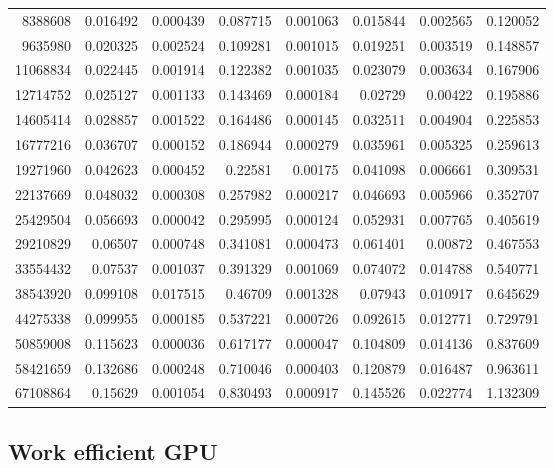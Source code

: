 \begin{longtable}{r r r r r r r r}
8388608 & 0.016492 & 0.000439 & 0.087715 & 0.001063 & 0.015844 & 0.002565 & 0.120052 \\
9635980 & 0.020325 & 0.002524 & 0.109281 & 0.001015 & 0.019251 & 0.003519 & 0.148857 \\
11068834 & 0.022445 & 0.001914 & 0.122382 & 0.001035 & 0.023079 & 0.003634 & 0.167906 \\
12714752 & 0.025127 & 0.001133 & 0.143469 & 0.000184 & 0.02729 & 0.00422 & 0.195886 \\
14605414 & 0.028857 & 0.001522 & 0.164486 & 0.000145 & 0.032511 & 0.004904 & 0.225853 \\
16777216 & 0.036707 & 0.000152 & 0.186944 & 0.000279 & 0.035961 & 0.005325 & 0.259613 \\
19271960 & 0.042623 & 0.000452 & 0.22581 & 0.00175 & 0.041098 & 0.006661 & 0.309531 \\
22137669 & 0.048032 & 0.000308 & 0.257982 & 0.000217 & 0.046693 & 0.005966 & 0.352707 \\
25429504 & 0.056693 & 0.000042 & 0.295995 & 0.000124 & 0.052931 & 0.007765 & 0.405619 \\
29210829 & 0.06507 & 0.000748 & 0.341081 & 0.000473 & 0.061401 & 0.00872 & 0.467553 \\
33554432 & 0.07537 & 0.001037 & 0.391329 & 0.001069 & 0.074072 & 0.014788 & 0.540771 \\
38543920 & 0.099108 & 0.017515 & 0.46709 & 0.001328 & 0.07943 & 0.010917 & 0.645629 \\
44275338 & 0.099955 & 0.000185 & 0.537221 & 0.000726 & 0.092615 & 0.012771 & 0.729791 \\
50859008 & 0.115623 & 0.000036 & 0.617177 & 0.000047 & 0.104809 & 0.014136 & 0.837609 \\
58421659 & 0.132686 & 0.000248 & 0.710046 & 0.000403 & 0.120879 & 0.016487 & 0.963611 \\
67108864 & 0.15629 & 0.001054 & 0.830493 & 0.000917 & 0.145526 & 0.022774 & 1.132309 \\
\end{longtable}

\subsection*{Work efficient GPU}

